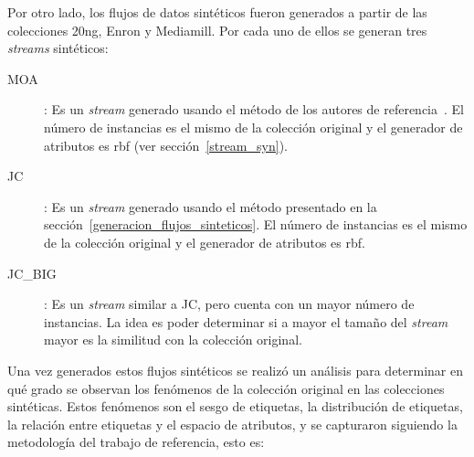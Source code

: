 Por otro lado, los flujos de datos sintéticos fueron generados a partir de las
colecciones 20ng, Enron y Mediamill. Por cada uno de ellos se generan tres
\textit{streams} sintéticos:

\begin{description}

	\item[MOA]: Es un \textit{stream} generado usando el método de los autores
	      de referencia~\cite{read_generating_2009}. El número de instancias es el
	      mismo de la colección original y el generador de atributos es
	      \acrfull{rbf} (ver sección~\ref{stream_syn}).

	\item[JC]: Es un \textit{stream} generado usando el método presentado en la
	      sección~\ref{generacion_flujos_sinteticos}. El número de instancias es
	      el mismo de la colección original y el generador de atributos es
	      \acrfull{rbf}.

	\item[JC\_BIG]: Es un \textit{stream} similar a JC, pero cuenta con un mayor
	      número de instancias. La idea es poder determinar si a mayor el tamaño
	      del \textit{stream} mayor es la similitud con la colección original.

\end{description}

Una vez generados estos flujos sintéticos se realizó un análisis para determinar
en qué grado se observan los fenómenos de la colección original en las
colecciones sintéticas. Estos fenómenos son el sesgo de etiquetas, la
distribución de etiquetas, la relación entre etiquetas y el espacio de
atributos, y se capturaron siguiendo la metodología del trabajo de referencia,
esto es:

